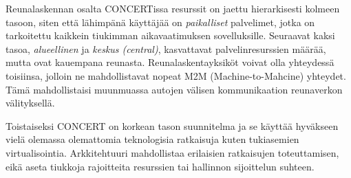  Reunalaskennan osalta CONCERTissa resurssit on jaettu hierarkisesti kolmeen tasoon, siten että lähimpänä käyttäjää on \textit{paikalliset} palvelimet, jotka on tarkoitettu kaikkein tiukimman aikavaatimuksen sovelluksille. Seuraavat kaksi tasoa, \textit{alueellinen} ja \textit{keskus (central)}, kasvattavat palvelinresurssien määrää, mutta ovat kauempana reunasta. Reunalaskentayksiköt voivat olla yhteydessä toisiinsa, jolloin ne mahdollistavat nopeat M2M (Machine-to-Mahcine) yhteydet. Tämä mahdollistaisi muunmuassa autojen välisen kommunikaation reunaverkon välityksellä. 

Toistaiseksi CONCERT on korkean tason suunnitelma ja se käyttää hyväkseen vielä olemassa olemattomia teknologisia ratkaisuja kuten tukiasemien virtualisointia. Arkkitehtuuri mahdollistaa erilaisien ratkaisujen toteuttamisen, eikä aseta tiukkoja rajoitteita resurssien tai hallinnon sijoittelun suhteen.

